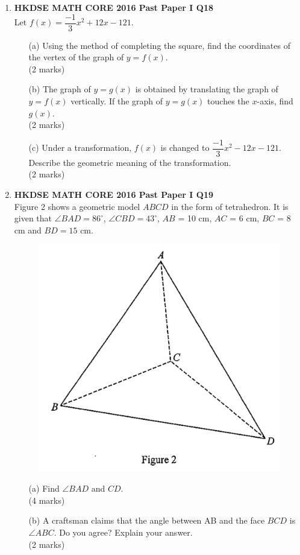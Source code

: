 \documentclass[12pt]{article}
\begin{document}
\begin{enumerate}
	\item \textbf{HKDSE MATH CORE 2016 Past Paper I Q18}\\
	Let $f(x) = \dfrac{-1}{3}x^2 + 12x - 121$.
	\begin{enumerate}
		\item[(a)] Using the method of completing the square, find the coordinates of the vertex of the graph of $y = f(x)$. \\(2 marks)
		\item[(b)] The graph of $y = g(x)$ is obtained by translating the graph of $y = f(x)$ vertically. If the graph of $y = g(x)$ touches the $x$-axis, find $g(x)$. \\(2 marks)
		\item[(c)] Under a transformation, $f(x)$ is changed to $\dfrac{-1}{3}x^2 - 12x - 121$. Describe the geometric meaning of the transformation. \\(2 marks)
	\end{enumerate}

	\item \textbf{HKDSE MATH CORE 2016 Past Paper I Q19}\\
	Figure 2 shows a geometric model $ABCD$ in the form of tetrahedron. It is given that $\angle BAD = 86^\circ$, $\angle CBD = 43^\circ$, $AB$ = 10 cm, $AC$ = 6 cm, $BC$ = 8 cm and $BD = 15$ cm.
	\begin{figure}[H]
		\centering
		\includegraphics[width = .3\linewidth]{2016Figure1.2}
	\end{figure} 
	\begin{enumerate}
		\item[(a)] Find $\angle BAD$ and $CD$. \\(4 marks)
		\item[(b)] A craftsman claims that the angle between AB and the face $BCD$ is $\angle ABC$. Do you agree? Explain your answer. \\(2 marks)
	\end{enumerate}


\end{enumerate}
\end{document}
